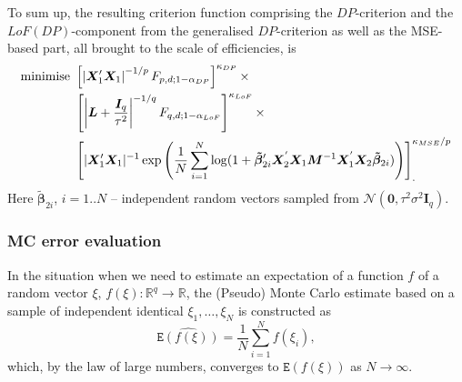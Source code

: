 To sum up, the resulting criterion function comprising the $DP$-criterion and the $LoF(DP)$-component from the generalised $DP$-criterion as well as the MSE-based part, all brought to the scale of efficiencies, is
\begin{align}
\label{eq::MSE_D}
\mbox{minimise }&\left[\left|\bm{X}'_{1}\bm{X}_{1}\right|^{-1/p}F_{p,d;1-\alpha_{DP}}\right]^{\kappa_{DP}} \times \notag \\ &\left[\left|\bm{L}+\frac{\bm{I}_{q}}{\tau^{2}}\right|^{-1/q}F_{q,d;1-\alpha_{LoF}}\right]^{\kappa_{LoF}}\times \notag\\ & \left[|\bm{X}'_{1}\bm{X}_{1}|^{-1}\exp\left(\frac{1}{N}\sum_{i=1}^{N}\log(1+\bm{\tilde{\beta}}_{2i}'\bm{X}_2^{'}\bm{X}_1\bm{M}^{-1}\bm{X}_1^{'}\bm{X}_2\bm{\tilde{\beta}}_{2i})\right)\right]_{.}^{\kappa_{MSE}/p}
\end{align}
Here $\bm{\tilde{\beta}}_{2i}$, $i=1..N$ -- independent random vectors sampled from $\mathcal{N}(\bm{0},\tau^{2}\sigma^{2}\bm{I}_{q})$.

\subsubsection{MC error evaluation}

In the situation when we need to estimate an expectation of a function $f$ of a random vector $\xi$, $f(\xi): \mathbb{R}^q \rightarrow \mathbb{R}$, the (Pseudo) Monte Carlo estimate based on a sample of independent identical $\xi_1,\ldots,\xi_N$ is constructed as
\begin{equation*}
\widehat{\mathtt{E}(f(\xi))}=\frac{1}{N}\sum_{i=1}^{N}f(\xi_{i}),
\end{equation*}
which, by the law of large numbers, converges to $\mathtt{E}(f(\xi))$ as $N\rightarrow\infty$.

